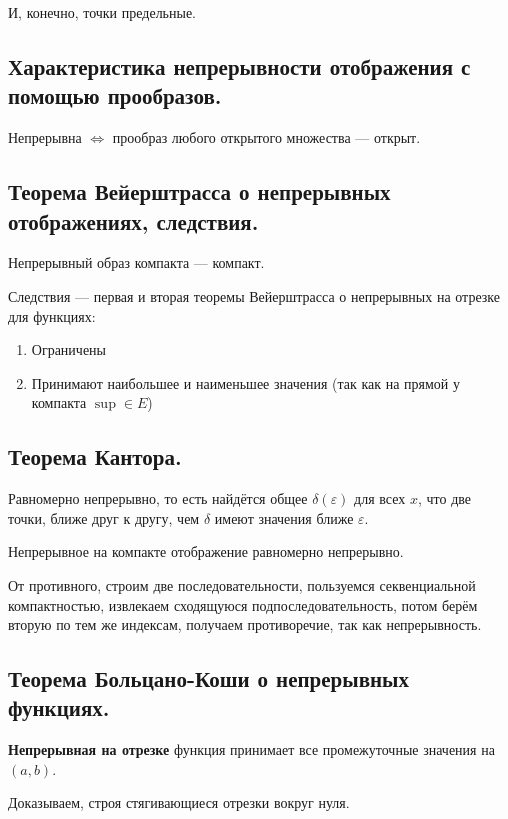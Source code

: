 \documentclass[12pt, a4paper]{article}
\begin{document}
И, конечно, точки предельные.



\subsection{Характеристика непрерывности отображения с помощью прообразов.}

Непрерывна $\Leftrightarrow$ прообраз любого открытого множества — открыт.


\subsection{Теорема Вейерштрасса о непрерывных отображениях, следствия.}

Непрерывный образ компакта — компакт.

Следствия — первая и вторая теоремы Вейерштрасса о непрерывных на отрезке для функциях:

\begin{enumerate}
    \item Ограничены
    \item Принимают наибольшее и наименьшее значения (так как на прямой у компакта $\sup \in E$)
\end{enumerate}


\subsection{Теорема Кантора.}

Равномерно непрерывно, то есть найдётся общее $\delta(\varepsilon)$ для всех $x$, 
что две точки, ближе друг к другу, чем $\delta$ имеют значения ближе $\varepsilon$. 

Непрерывное на компакте отображение равномерно непрерывно.

От противного, строим две последовательности,  
пользуемся секвенциальной компактностью, извлекаем сходящуюся 
подпоследовательность, потом берём вторую по тем же индексам, получаем противоречие, так как непрерывность.

\subsection{Теорема Больцано-Коши о непрерывных функциях.}

\textbf{Непрерывная на отрезке} функция принимает все промежуточные значения на $(a, b)$.

Доказываем, строя стягивающиеся отрезки вокруг нуля.
\end{document}
